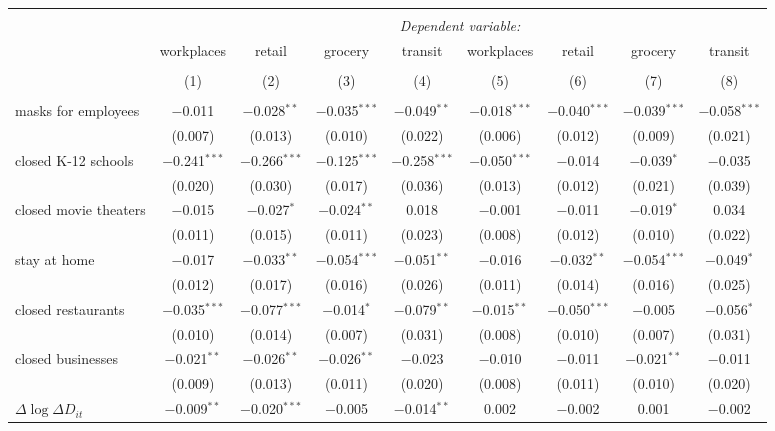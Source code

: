 \begin{tabular}{@{\extracolsep{1pt}}lcccccccc} 
\\[-1.8ex]\hline 
\hline \\[-1.8ex] 
 & \multicolumn{8}{c}{\textit{Dependent variable:}} \\ 
\cline{2-9} 
 & workplaces & retail & grocery & transit & workplaces & retail & grocery & transit \\ 
\\[-1.8ex] & (1) & (2) & (3) & (4) & (5) & (6) & (7) & (8)\\ 
\hline \\[-1.8ex] 
 masks for employees & $-$0.011 & $-$0.028$^{**}$ & $-$0.035$^{***}$ & $-$0.049$^{**}$ & $-$0.018$^{***}$ & $-$0.040$^{***}$ & $-$0.039$^{***}$ & $-$0.058$^{***}$ \\ 
  & (0.007) & (0.013) & (0.010) & (0.022) & (0.006) & (0.012) & (0.009) & (0.021) \\ 
  closed K-12 schools & $-$0.241$^{***}$ & $-$0.266$^{***}$ & $-$0.125$^{***}$ & $-$0.258$^{***}$ & $-$0.050$^{***}$ & $-$0.014 & $-$0.039$^{*}$ & $-$0.035 \\ 
  & (0.020) & (0.030) & (0.017) & (0.036) & (0.013) & (0.012) & (0.021) & (0.039) \\ 
  closed movie theaters & $-$0.015 & $-$0.027$^{*}$ & $-$0.024$^{**}$ & 0.018 & $-$0.001 & $-$0.011 & $-$0.019$^{*}$ & 0.034 \\ 
  & (0.011) & (0.015) & (0.011) & (0.023) & (0.008) & (0.012) & (0.010) & (0.022) \\ 
  stay at home & $-$0.017 & $-$0.033$^{**}$ & $-$0.054$^{***}$ & $-$0.051$^{**}$ & $-$0.016 & $-$0.032$^{**}$ & $-$0.054$^{***}$ & $-$0.049$^{*}$ \\ 
  & (0.012) & (0.017) & (0.016) & (0.026) & (0.011) & (0.014) & (0.016) & (0.025) \\ 
  closed restaurants & $-$0.035$^{***}$ & $-$0.077$^{***}$ & $-$0.014$^{*}$ & $-$0.079$^{**}$ & $-$0.015$^{**}$ & $-$0.050$^{***}$ & $-$0.005 & $-$0.056$^{*}$ \\ 
  & (0.010) & (0.014) & (0.007) & (0.031) & (0.008) & (0.010) & (0.007) & (0.031) \\ 
  closed businesses & $-$0.021$^{**}$ & $-$0.026$^{**}$ & $-$0.026$^{**}$ & $-$0.023 & $-$0.010 & $-$0.011 & $-$0.021$^{**}$ & $-$0.011 \\ 
  & (0.009) & (0.013) & (0.011) & (0.020) & (0.008) & (0.011) & (0.010) & (0.020) \\ 
  $\Delta \log \Delta D_{it}$ & $-$0.009$^{**}$ & $-$0.020$^{***}$ & $-$0.005 & $-$0.014$^{**}$ & 0.002 & $-$0.002 & 0.001 & $-$0.002 \\ 

\end{tabular}
